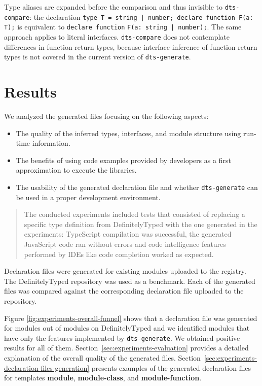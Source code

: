 \documentclass[sigconf]{acmart}
\begin{document}
Type aliases are expanded before the comparison and thus invisible to
\texttt{dts-compare}: the declaration
\lstinline{type T = string | number; declare function F(a: T);} is equivalent to
\lstinline{declare function} \lstinline{F(a: string | number);}. The same approach applies to literal
interfaces. \texttt{dts-compare} does 
not contemplate differences in function return types, because interface inference of
function return types is not covered in the current version of \texttt{dts-generate}. 

\section{Results}
\label{sec:results}
We analyzed the generated files focusing on the following aspects:
\begin{itemize}
  \item The quality of the inferred types, interfaces, and module structure using run-time information.
  \item The benefits of using code examples provided by developers as
    a first approximation to execute the libraries. %
  \item The usability of the generated declaration file and whether \texttt{dts-generate} can be used in a proper development environment.
\end{itemize}

\begin{quotation}
  The conducted experiments included tests that consisted of replacing
  a specific type definition from DefinitelyTyped
  \cite{definitely-typed-repository} with the one generated in the
  experiments: TypeScript compilation was successful, the generated
  JavaScript code ran without errors and code intelligence features
  performed by IDEs like code completion worked as expected.
\end{quotation}

Declaration files were generated for existing modules uploaded to the
\NPM{} registry. The DefinitelyTyped repository was used as a
benchmark. Each of the generated files was compared against the
corresponding declaration file uploaded to the repository.

Figure \ref{fig:experiments-overall-funnel} shows that a declaration file was generated
for \CountModulesGeneratedDeclarationFile{} modules out of
\CountTotalModulesDefinitelyTyped{} modules on DefinitelyTyped and we identified \CountModulesOnlySolvableDifferences{} modules that have only the
features implemented by \texttt{dts-generate}. We obtained positive results for all of
them. Section~\ref{sec:experiments-evaluation} provides a detailed explanation of the overall
quality of the generated files.
Section~\ref{sec:experiments-declaration-files-generation} presents examples of the generated declaration files for
templates \textbf{module}, \textbf{module-class}, and \textbf{module-function}.
\end{document}
